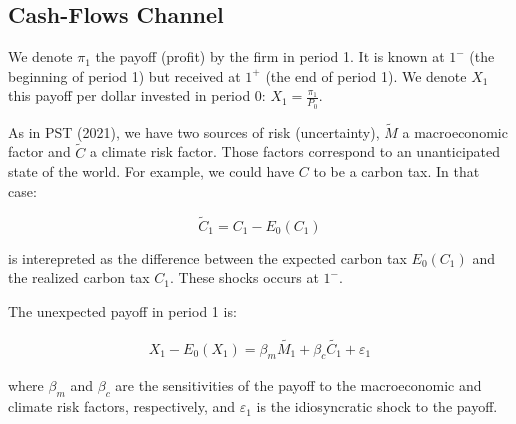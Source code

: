 \subsection{Cash-Flows Channel}

We denote $\pi_1$ the payoff (profit) by the
firm in period 1. It is known at $1^{-}$ (the beginning
of period 1) but received at $1^{+}$ (the end of period 1).
We denote $X_1$ this payoff per dollar 
invested in period 0: $X_1 = \frac{\pi_1}{P_0}$.

As in PST (2021), we have two sources of risk (uncertainty), $\tilde{M}$
a macroeconomic factor and $\tilde{C}$ a climate risk factor.
Those factors correspond to an unanticipated state of the world. 
For example, we could have $C$ to be a carbon tax. In that case:

\begin{equation}
    \tilde{C}_1 = C_1 - E_0(C_1)
\end{equation}

is interepreted as the difference between the expected carbon tax 
$E_0(C_1)$ and the realized carbon tax $C_1$.
These shocks occurs at $1^{-}$.

The unexpected payoff in period 1 is:

\begin{equation}
    \begin{aligned}
    X_1 - E_0(X_1) = \beta_m \tilde{M_1} + \beta_{c} \tilde{C_1} + \varepsilon_1
    \end{aligned}
\end{equation}

where $\beta_m$ and $\beta_{c}$ are the sensitivities of the payoff to the macroeconomic and climate risk factors, respectively, 
and $\varepsilon_1$ is the idiosyncratic shock to the payoff.


